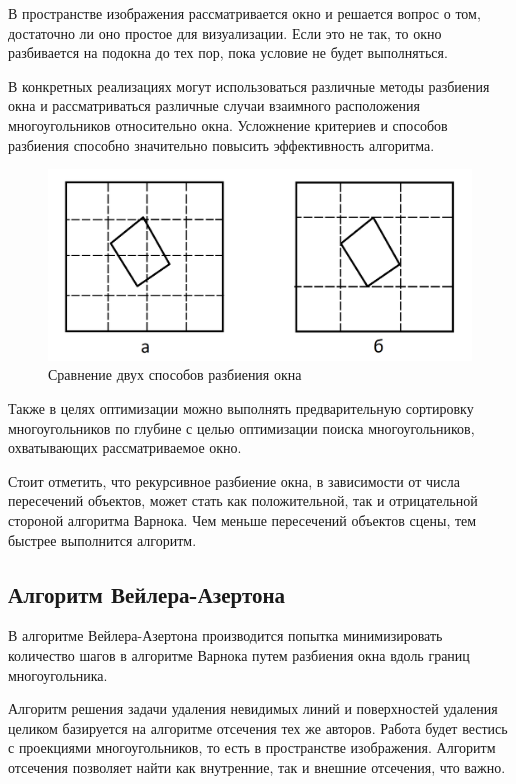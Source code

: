 В пространстве изображения рассматривается окно и решается вопрос о том, достаточно ли оно простое для визуализации. Если это не так, то окно разбивается на подокна до тех пор, пока условие не будет выполняться. 

В конкретных реализациях могут использоваться различные методы разбиения окна и рассматриваться различные случаи взаимного расположения многоугольников относительно окна. Усложнение критериев и способов разбиения способно значительно повысить эффективность алгоритма. 

\begin{figure}[h]
	\centering
	\includegraphics[width=\textwidth ]{img/subdivide.png}
	\caption{Сравнение двух способов разбиения окна}
\end{figure} 

Также в целях оптимизации можно выполнять предварительную сортировку многоугольников по глубине с целью оптимизации поиска многоугольников, охватывающих рассматриваемое окно.

Стоит отметить, что рекурсивное разбиение окна, в зависимости от числа пересечений объектов, может стать как положительной, так и отрицательной стороной алгоритма Варнока. Чем меньше пересечений объектов сцены, тем быстрее выполнится алгоритм.

\subsection{Алгоритм Вейлера-Азертона}
В алгоритме Вейлера-Азертона  производится попытка минимизировать количество шагов в алгоритме Варнока путем разбиения окна вдоль границ многоугольника.

Алгоритм решения задачи удаления невидимых линий и поверхностей удаления целиком базируется на алгоритме отсечения тех же авторов. Работа будет вестись с проекциями многоугольников, то есть в пространстве изображения. Алгоритм отсечения позволяет найти как внутренние, так и внешние отсечения, что важно.

